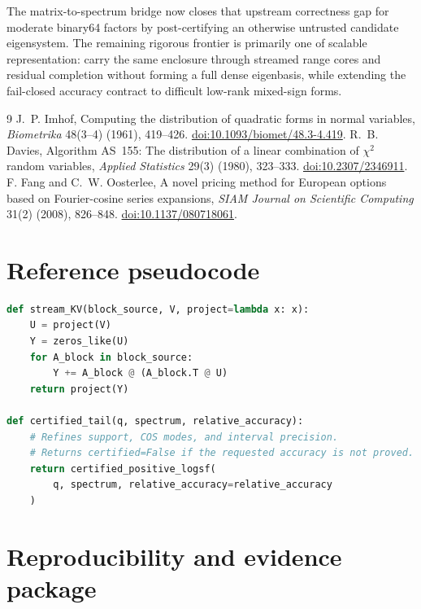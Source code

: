 \documentclass[11pt]{article}
\theoremstyle{definition}
\theoremstyle{remark}
\begin{document}
The matrix-to-spectrum bridge now closes that upstream correctness gap for
moderate binary64 factors by post-certifying an otherwise untrusted candidate
eigensystem.  The remaining rigorous frontier is primarily one of scalable
representation: carry the same enclosure through streamed range cores and
residual completion without forming a full dense eigenbasis, while extending
the fail-closed accuracy contract to difficult low-rank mixed-sign forms.



\begin{thebibliography}{9}
 J.~P. Imhof, Computing the distribution of quadratic forms
in normal variables, \emph{Biometrika} 48(3--4) (1961), 419--426.
\href{https://doi.org/10.1093/biomet/48.3-4.419}{doi:10.1093/biomet/48.3-4.419}.
 R.~B. Davies, Algorithm AS~155: The distribution of a
linear combination of $\chi^2$ random variables,
\emph{Applied Statistics} 29(3) (1980), 323--333.
\href{https://doi.org/10.2307/2346911}{doi:10.2307/2346911}.
 F. Fang and C.~W. Oosterlee, A novel pricing
method for European options based on Fourier-cosine series expansions,
\emph{SIAM Journal on Scientific Computing} 31(2) (2008), 826--848.
\href{https://doi.org/10.1137/080718061}{doi:10.1137/080718061}.
\end{thebibliography}

\appendix

\section{Reference pseudocode}\label{sec:final-A}

\begin{lstlisting}[language=Python]
def stream_KV(block_source, V, project=lambda x: x):
    U = project(V)
    Y = zeros_like(U)
    for A_block in block_source:
        Y += A_block @ (A_block.T @ U)
    return project(Y)

def certified_tail(q, spectrum, relative_accuracy):
    # Refines support, COS modes, and interval precision.
    # Returns certified=False if the requested accuracy is not proved.
    return certified_positive_logsf(
        q, spectrum, relative_accuracy=relative_accuracy
    )
\end{lstlisting}

\section{Reproducibility and evidence package}\label{sec:final-B}
\end{document}
